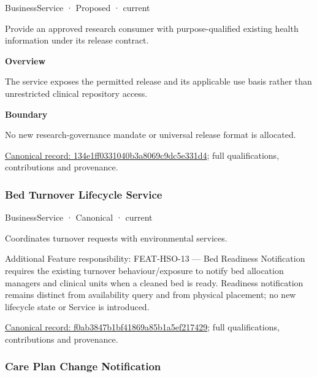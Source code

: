 \label{element:134e1ff0331040b3a8069c9dc5e331d4}
{\small BusinessService · Proposed · current}\par

Provide an approved research consumer with purpose-qualified existing health information under its release contract.



\textbf{Overview}



The service exposes the permitted release and its applicable use basis rather than unrestricted clinical repository access.



\textbf{Boundary}



No new research-governance mandate or universal release format is allocated.


{\footnotesize \href{../../../../continuum/business/business-service/134e1ff0331040b3a8069c9dc5e331d4.md}{Canonical record: 134e1ff0331040b3a8069c9dc5e331d4}; full qualifications, contributions and provenance.}\par
\subsubsection{Bed Turnover Lifecycle Service}

\label{element:f0ab3847b1bf41869a85b1a5ef217429}
{\small BusinessService · Canonical · current}\par

Coordinates turnover requests with environmental services.



Additional Feature responsibility: FEAT-HSO-13 — Bed Readiness Notification requires the existing turnover behaviour/exposure to notify bed allocation managers and clinical units when a cleaned bed is ready. Readiness notification remains distinct from availability query and from physical placement; no new lifecycle state or Service is introduced.


{\footnotesize \href{../../../../continuum/business/business-service/f0ab3847b1bf41869a85b1a5ef217429.md}{Canonical record: f0ab3847b1bf41869a85b1a5ef217429}; full qualifications, contributions and provenance.}\par
\subsubsection{Care Plan Change Notification}

